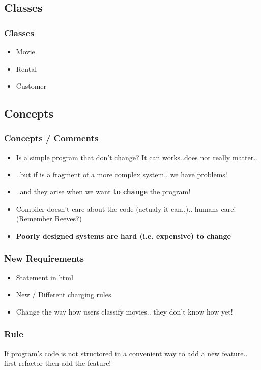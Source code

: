 \documentclass{beamer}
\begin{document}
\subsection{Classes}
\begin{frame}
  \frametitle{Classes}
  \begin{itemize}
  		\item Movie
		\item Rental
		\item Customer
  \end{itemize}
\end{frame}

\subsection{Concepts}
\begin{frame}
  \frametitle{Concepts / Comments}
  \begin{itemize}
  		\item<+-> Is a simple program that don't change? It can works..does not really matter..
		\item<+-> ..but if is a fragment of a more complex system.. we have problems!
		\item<+-> ..and they arise when we want \textbf{to change} the program!
		\item<+-> Compiler doesn't care about the code (actualy it can..).. humans care! (Remember Reeves?)
		\item<+-> \textbf{Poorly designed systems are hard (i.e. expensive) to change}
  \end{itemize}
\end{frame}

\begin{frame}
  \frametitle{New Requirements}
  \begin{itemize}
  		\item Statement in html
		\item New / Different charging rules
		\item Change the way how users classify movies.. they don't know how yet!
  \end{itemize}
\end{frame}

\begin{frame}
  \frametitle{Rule}
  If program's code is not structored in a convenient way to add a new feature.. first refactor then add the feature!
\end{frame}
\end{document}
